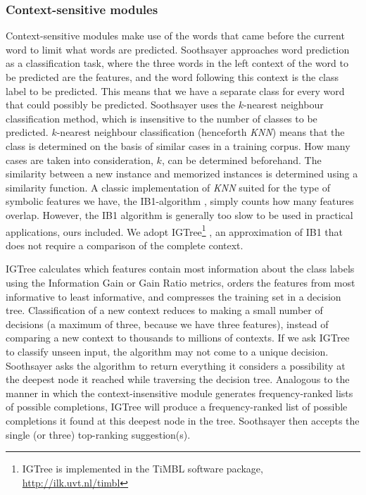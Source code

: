 \documentclass[12pt]{article}
\begin{document}
\subsubsection{Context-sensitive modules} \label{cs}

Context-sensitive modules make use of the words that came before the current word to limit what words are predicted. Soothsayer approaches word prediction as a classification task, where the three words in the left context of the word to be predicted are the features, and the word following this context is the class label to be predicted. This means that we have a separate class for every word that could possibly be predicted. Soothsayer uses the $k$-nearest neighbour classification method, which is insensitive to the number of classes to be predicted. $k$-nearest neighbour classification (henceforth \emph{KNN}) means that the class is determined on the basis of similar cases in a training corpus. How many cases are taken into consideration, $k$, can be determined beforehand. The similarity between a new instance and memorized instances is determined using a similarity function.  A classic implementation of \emph{KNN} suited for the type of symbolic features we have, the IB1-algorithm \cite{aha+91}, simply counts how many features overlap. However, the IB1 algorithm is generally too slow to be used in practical applications, ours included. We adopt IGTree\footnote{IGTree is implemented in the TiMBL software package, \url{http://ilk.uvt.nl/timbl}} \cite{daelemans+97}, an approximation of IB1 that does not require a comparison of the complete context.

IGTree calculates which features contain most information about the class labels using the Information Gain or Gain Ratio metrics, orders the features from most informative to least informative, and compresses the training set in a decision tree. Classification of a new context reduces to making a small number of decisions (a maximum of three, because we have three features), instead of comparing a new context to thousands to millions of contexts. If we ask IGTree to classify unseen input, the algorithm may not come to a unique decision. Soothsayer asks the algorithm to return everything it considers a possibility at the deepest node it reached while traversing the decision tree. Analogous to the manner in which the context-insensitive module generates frequency-ranked lists of possible completions, IGTree will produce a frequency-ranked list of possible completions it found at this deepest node in the tree. Soothsayer then accepts the single (or three) top-ranking suggestion(s).
\end{document}
